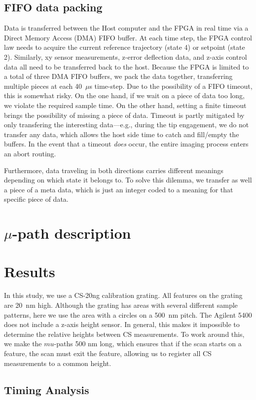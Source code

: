 \documentclass[letterpaper, 10 pt, conference]{ieeeconf}  %
\begin{document}
\subsection{FIFO data packing}\label{sec:pack}
Data is transferred between the Host computer and the FPGA in real time via a Direct Memory Access (DMA) FIFO buffer. At each time step, the FPGA control law needs to acquire the current reference trajectory (state 4) or setpoint (state 2). Similarly, xy sensor measurements, z-error deflection data, and z-axis control data all need to be transferred back to the host. Because the FPGA is limited to a total of three DMA FIFO buffers, we pack the data together, transferring multiple pieces at each 40~$\mu$s time-step. Due to the possibility of a FIFO timeout, this is somewhat risky. On the one hand, if we wait on a piece of data too long, we violate the required sample time. On the other hand, setting a finite timeout brings the possibility of missing a piece of data. Timeout is partly mitigated by only transfering the interesting data---e.g., during the tip engagement, we do not transfer any data, which allows the host side time to catch and fill/empty the buffers. In the event that a timeout \emph{does} occur, the entire imaging process enters an abort routing. 

Furthermore, data traveling in both directions carries different meanings depending on which state it belongs to. To solve this dilemma, we transfer as well a piece of a meta data, which is just an integer coded to a meaning for that specific piece of data. 
\section{$\mu$-path description}

\section{Results}
In this study, we use a CS-20ng calibration grating. All features on the grating are 20~nm high. Although the grating has areas with several different sample patterns, here we use the area with a circles on a 500~nm pitch. The Agilent 5400 does not include a z-axis height sensor. In general, this makes it impossible to determine the relative heights between CS measurements. To work around this, we make the $mu$-paths 500 nm long, which ensures that if the scan starts on a feature, the scan must exit the feature, allowing us to register all CS measurements to a common height. 
\subsection{Timing Analysis}
\end{document}
